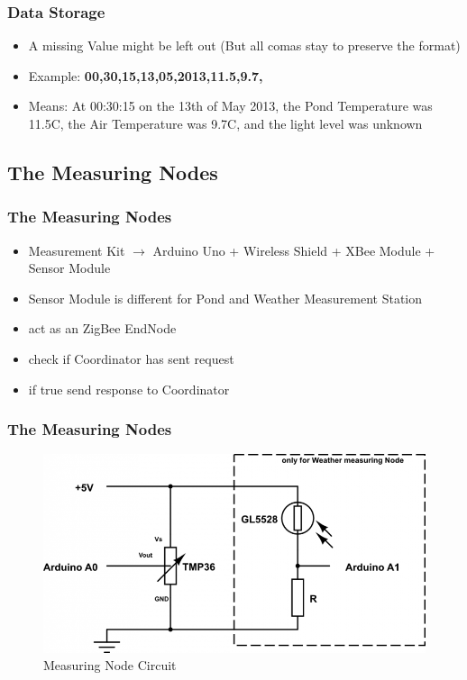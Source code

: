 \documentclass{beamer}
\begin{document}
\begin{frame}
	\frametitle{Data Storage}
	\begin{itemize}
		\item A missing Value might be left out (But all comas stay to preserve the format)
		\item Example: \textbf{00,30,15,13,05,2013,11.5,9.7,}
		\item Means: At 00:30:15 on the 13th of May 2013, the Pond Temperature was 11.5C, the Air Temperature was 9.7C, and the light level was unknown
	\end{itemize}
\end{frame}


\subsection{The Measuring Nodes}

\frame
{
	\frametitle{The Measuring Nodes}
	\begin{itemize}
	\item Measurement Kit $\rightarrow$ Arduino Uno + Wireless Shield + XBee Module + 	Sensor Module	
	\item Sensor Module is different for Pond and Weather Measurement Station
	\item act as an ZigBee EndNode
	\item check if Coordinator has sent request
	\item if true send response to Coordinator	
	\end{itemize}
}

\frame
{
	\frametitle{The Measuring Nodes}
	\begin{figure}[h!]
  		\centering
    	\includegraphics[width=\textwidth]{../Images/Circuit.png}
		\caption{Measuring Node Circuit}
	\end{figure}
} 
\end{document}
